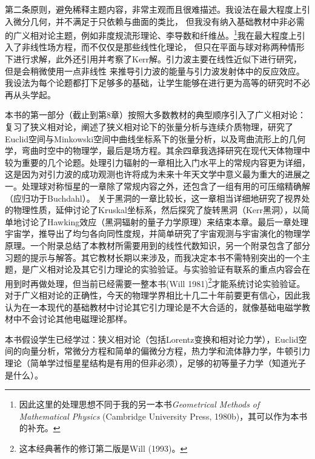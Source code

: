 第二条原则，避免稀释主题内容，非常主观而且很难描述。我设法在最大程度上引入微分几何，并不满足于只依赖与曲面的类比，%
但我没有纳入基础教材中非必需的广义相对论主题，例如非度规流形理论、李导数和纤维丛。\footnote{因此这里的处理思想不同于我的另一本书\textit{Geometrical Methods of Mathematical Physics} (Cambridge University Press, 1980b)，其可以作为本书的补充。}我在最大程度上引入了非线性场方程，而不仅仅是那些线性化理论，%
但只在平面与球对称两种情形下进行求解，此外还引用并考察了Kerr解。引力波主要在线性近似下进行研究，但是会稍微使用一点非线性%
来推导引力波的能量与引力波发射体中的反应效应。%
我设法为每个论题都打下足够多的基础，让学生能够在进行更为高等的研究时不必再从头学起。

本书的第一部分（截止到第8章）按照大多数教材的典型顺序引入了广义相对论：复习了狭义相对论，阐述了狭义相对论下的张量分析与连续介质物理，研究了Euclid空间与Minkowski空间中曲线坐标系下的张量分析，以及弯曲流形上的几何学，弯曲时空中的物理学，最后是场方程。其余四章我选择研究在现代天体物理中较为重要的几个论题。处理引力辐射的一章相比入门水平上的常规内容更为详细，这是因为对引力波的成功观测也许将成为未来十年天文学中意义最为重大的进展之一。处理球对称恒星的一章除了常规内容之外，还包含了一组有用的可压缩精确解（应归功于Buchdahl）。%
关于黑洞的一章比较长，这一章相当详细地研究了视界处的物理性质，延伸讨论了Kruskal坐标系，然后探究了旋转黑洞（Kerr黑洞），以简单地讨论了Hawking效应（黑洞辐射的量子力学原理）来结束本章。最后一章处理宇宙学，推导出了均匀各向同性度规，并简单研究了宇宙观测与宇宙演化的物理学原理。一个附录总结了本教材所需要用到的线性代数知识，另一个附录包含了部分习题的提示与解答。其它教材长期以来涉及，而我决定本书不需特别突出的一个主题，是广义相对论及其它引力理论的实验验证。与实验验证有联系的重点内容会在用到时再做处理，但当前已经需要一整本书(Will 1981)\footnote{这本经典著作的修订第二版是Will (1993)。}才能系统讨论实验验证。对于广义相对论的正确性，今天的物理学界相比十几二十年前要更有信心，因此我认为在一本现代的基础教材中讨论其它引力理论是不大合适的，就像基础电磁学教材中不会讨论其他电磁理论那样。

本书假设学生已经学过：狭义相对论（包括Lorentz变换和相对论力学），Euclid空间的向量分析，常微分方程和简单的偏微分方程，热力学和流体静力学，牛顿引力理论（简单学过恒星星结构是有用的但非必须），足够的初等量子力学（知道光子是什么）。


